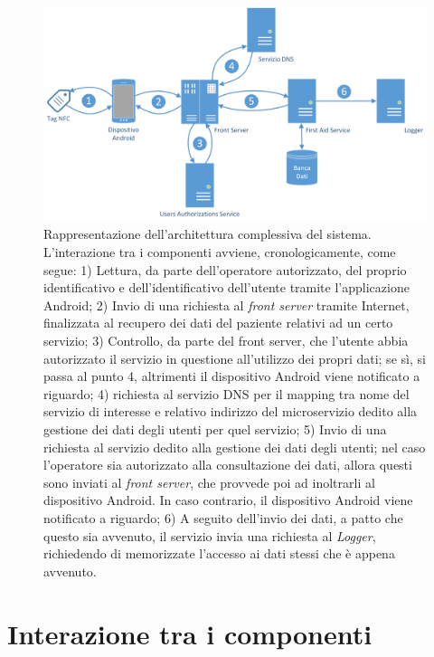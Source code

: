 \documentclass[a4paper,12pt]{report}
\begin{document}
\begin{figure}[H]
	\hspace*{-0.7in}
	\centering
	\includegraphics[width=180mm]{./img/general_architecture.png}
	\caption{Rappresentazione dell'architettura complessiva del sistema. L'interazione tra i componenti avviene, cronologicamente, come segue: 1) Lettura, da parte dell'operatore autorizzato, del proprio identificativo e dell'identificativo dell'utente tramite l'applicazione Android; 2) Invio di una richiesta al \emph{front server} tramite Internet, finalizzata al recupero dei dati del paziente relativi ad un certo servizio; 3) Controllo, da parte del front server, che l'utente abbia autorizzato il servizio in questione all'utilizzo dei propri dati; se sì, si passa al punto 4, altrimenti il dispositivo Android viene notificato a riguardo; 4) richiesta al servizio DNS per il mapping tra nome del servizio di interesse e relativo indirizzo del microservizio dedito alla gestione dei dati degli utenti per quel servizio; 5) Invio di una richiesta al servizio dedito alla gestione dei dati degli utenti; nel caso l'operatore sia autorizzato alla consultazione dei dati, allora questi sono inviati al \emph{front server}, che provvede poi ad inoltrarli al dispositivo Android. In caso contrario, il dispositivo Android viene notificato a riguardo; 6) A seguito dell'invio dei dati, a patto che questo sia avvenuto, il servizio invia una richiesta al \emph{Logger}, richiedendo di memorizzate l'accesso ai dati stessi che è appena avvenuto.\label{general_architecture}}
\end{figure}

\section{Interazione tra i componenti} \label{components_interaction}
\end{document}
